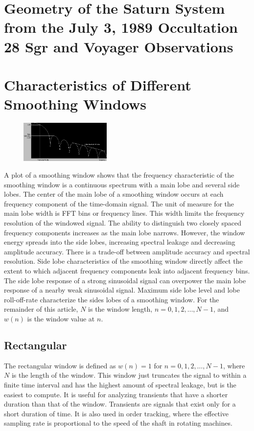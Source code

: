 \documentclass{article}
\theoremstyle{mystyle}
\begin{document}
\section{Geometry of the Saturn System from the July 3, 1989 Occultation 28 Sgr and Voyager Observations}
\section{Characteristics of Different Smoothing Windows}
\begin{figure}
	\begin{center}
	\includegraphics[width = 0.4\textwidth]{CDSW_1}
	\end{center}
\end{figure}
\noindent A plot of a smoothing window shows that the frequency characteristic of the smoothing window is a continuous spectrum with a main lobe and several side lobes. The center of the main lobe of a smoothing window occurs at each frequency component of the time-domain signal. The unit of measure for the main lobe width is FFT bins or frequency lines. This width limits the frequency resolution of the windowed signal. The ability to distinguish two closely spaced frequency components increases as the main lobe narrows. However, the window energy spreads into the side lobes, increasing spectral leakage and decreasing amplitude accuracy. There is a trade-off between amplitude accuracy and spectral resolution. Side lobe characteristics of the smoothing window directly affect the extent to which adjacent frequency components leak into adjacent frequency bins. The side lobe response of a strong sinusoidal signal can overpower the main lobe response of a nearby weak sinusoidal signal. Maximum side lobe level and lobe roll-off-rate characterize the sides lobes of a smoothing window. For the remainder of this article, $N$ is the window length, $n=0,1,2,\hdots, N-1$, and $w(n)$ is the window value at $n$.
\subsection{Rectangular}
\noindent The rectangular window is defined as $w(n) = 1$ for $n=0,1,2,\hdots, N-1$, where $N$ is the length of the window. This window just truncates the signal to within a finite time interval and has the highest amount of spectral leakage, but is the easiest to compute. It is useful for analyzing transients that have a shorter duration than that of the window. Transients are signals that exist only for a short duration of time. It is also used in order tracking, where the effective sampling rate is proportional to the speed of the shaft in rotating machines. 
\end{document}
